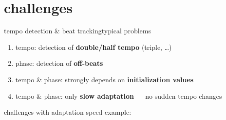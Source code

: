     \section{challenges}
        \begin{frame}{tempo detection \& beat tracking}{typical problems}
            \begin{enumerate}
                \item	tempo: detection of \textbf{double/half tempo} (triple, \ldots)
                \smallskip
                \item<1->	phase: detection of \textbf{off-beats}
                \smallskip
                \item<1->	tempo \& phase: strongly depends on \textbf{initialization values}
                \smallskip
                \item<1->	tempo \& phase: only \textbf{slow adaptation} --- no sudden tempo changes
            \end{enumerate}
            
            challenges with adaptation speed example:                     
        \end{frame}
   
